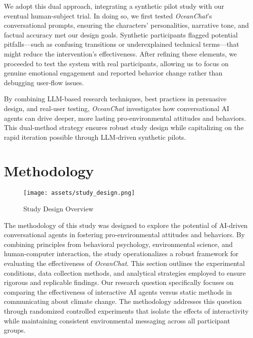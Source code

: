 \documentclass[sigconf, nonacm]{acmart}
\begin{document}
We adopt this dual approach, integrating a synthetic pilot study with our eventual human-subject trial. In doing so, we first tested \textit{OceanChat}’s conversational prompts, ensuring the characters’ personalities, narrative tone, and factual accuracy met our design goals. Synthetic participants flagged potential pitfalls—such as confusing transitions or underexplained technical terms—that might reduce the intervention’s effectiveness. After refining these elements, we proceeded to test the system with real participants, allowing us to focus on genuine emotional engagement and reported behavior change rather than debugging user-flow issues.

By combining LLM-based research techniques, best practices in persuasive design, and real-user testing, \textit{OceanChat} investigates how conversational AI agents can drive deeper, more lasting pro-environmental attitudes and behaviors. This dual-method strategy ensures robust study design while capitalizing on the rapid iteration possible through LLM-driven synthetic pilots.

\section{Methodology}
\begin{figure*}[!b] %
    \centering
    \texttt{[image: assets/study\_design.png]}
    \caption{Study Design Overview}
    \label{fig:ocean-chat-study-design}
\end{figure*}

The methodology of this study was designed to explore the potential of AI-driven conversational agents in fostering pro-environmental attitudes and behaviors. By combining principles from behavioral psychology, environmental science, and human-computer interaction, the study operationalizes a robust framework for evaluating the effectiveness of \textit{OceanChat}. This section outlines the experimental conditions, data collection methods, and analytical strategies employed to ensure rigorous and replicable findings. Our research question specifically focuses on comparing the effectiveness of interactive AI agents versus static methods in communicating about climate change. The methodology addresses this question through randomized controlled experiments that isolate the effects of interactivity while maintaining consistent environmental messaging across all participant groups.
\end{document}

